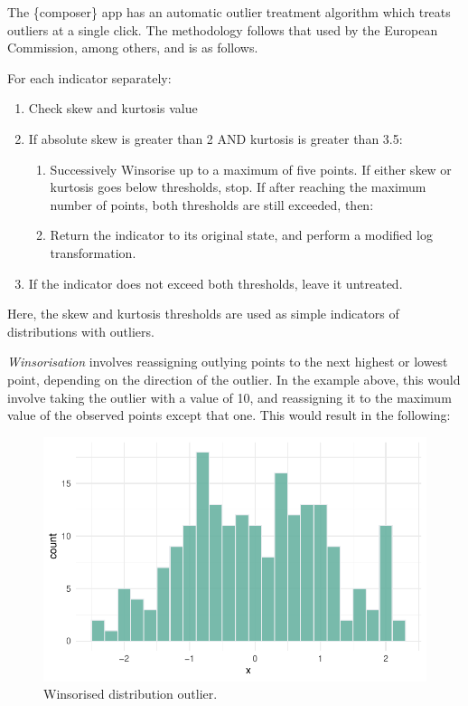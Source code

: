 \documentclass[
  letterpaper,
  DIV=11,
  numbers=noendperiod]{scrreprt}
\providecommand{\tightlist}{%
  \setlength{\itemsep}{0pt}\setlength{\parskip}{0pt}}\usepackage{longtable,booktabs,array}
\begin{document}
The \{composer\} app has an automatic outlier treatment algorithm which
treats outliers at a single click. The methodology follows that used by
the European Commission, among others, and is as follows.

For each indicator separately:

\begin{enumerate}
\def\labelenumi{\arabic{enumi}.}
\tightlist
\item
  Check skew and kurtosis value
\item
  If absolute skew is greater than 2 AND kurtosis is greater than 3.5:

  \begin{enumerate}
  \def\labelenumii{(\alph{enumii})}
  \tightlist
  \item
    Successively Winsorise up to a maximum of five points. If either
    skew or kurtosis goes below thresholds, stop. If after reaching the
    maximum number of points, both thresholds are still exceeded, then:
  \item
    Return the indicator to its original state, and perform a modified
    log transformation.
  \end{enumerate}
\item
  If the indicator does not exceed both thresholds, leave it untreated.
\end{enumerate}

Here, the skew and kurtosis thresholds are used as simple indicators of
distributions with outliers.

\emph{Winsorisation} involves reassigning outlying points to the next
highest or lowest point, depending on the direction of the outlier. In
the example above, this would involve taking the outlier with a value of
10, and reassigning it to the maximum value of the observed points
except that one. This would result in the following:

\begin{figure}

{\centering \includegraphics{outliers_files/figure-pdf/unnamed-chunk-2-1.pdf}

}

\caption{Winsorised distribution outlier.}

\end{figure}
\end{document}
